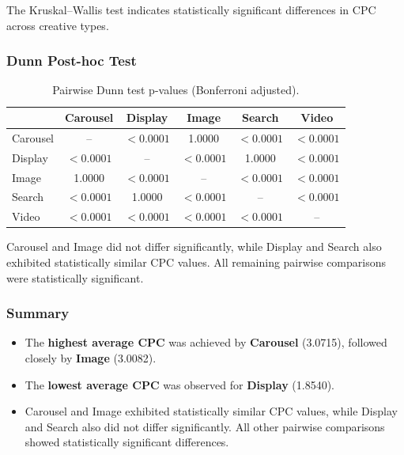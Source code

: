 The Kruskal--Wallis test indicates statistically significant differences in CPC across creative types.

\vspace{0.3cm}

\subsubsection{Dunn Post-hoc Test}

\begin{table}[H]
	\centering
	\caption{Pairwise Dunn test p-values (Bonferroni adjusted).}
	\begin{tabular}{lccccc}
		\toprule
		& Carousel & Display & Image & Search & Video \\
		\midrule
		Carousel & -- & $<0.0001$ & 1.0000 & $<0.0001$ & $<0.0001$ \\
		Display & $<0.0001$ & -- & $<0.0001$ & 1.0000 & $<0.0001$ \\
		Image & 1.0000 & $<0.0001$ & -- & $<0.0001$ & $<0.0001$ \\
		Search & $<0.0001$ & 1.0000 & $<0.0001$ & -- & $<0.0001$ \\
		Video & $<0.0001$ & $<0.0001$ & $<0.0001$ & $<0.0001$ & -- \\
		\bottomrule
	\end{tabular}
\end{table}

Carousel and Image did not differ significantly, while Display and Search also exhibited statistically similar CPC values. All remaining pairwise comparisons were statistically significant.

\subsubsection{Summary}

\begin{itemize}
	\item The \textbf{highest average CPC} was achieved by \textbf{Carousel} (3.0715), followed closely by \textbf{Image} (3.0082).
	\item The \textbf{lowest average CPC} was observed for \textbf{Display} (1.8540).
	\item Carousel and Image exhibited statistically similar CPC values, while Display and Search also did not differ significantly. All other pairwise comparisons showed statistically significant differences.
\end{itemize}

